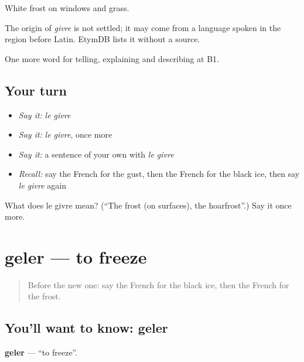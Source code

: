 White frost on windows and grass.

\begin{cousinweb}
The origin of \emph{givre} is not settled; it may come from a language spoken in the region before Latin. EtymDB lists it without a source.
\end{cousinweb}

\begin{grammarlens}[title={What you've built}]
One more word for telling, explaining and describing at B1.
\end{grammarlens}

\subsection*{Your turn}
\begin{itemize}
\raggedright
  \item \emph{Say it:} \emph{le givre}
  \item \emph{Say it:} \emph{le givre}, once more
  \item \emph{Say it:} a sentence of your own with \emph{le givre}
  \item \emph{Recall:} say the French for the gust, then the French for the black ice, then say \emph{le givre} again
\end{itemize}

\begin{tcolorbox}[breakable,colback=teal!4,colframe=teal!35!black,title={Before you move on}]
What does le givre mean? (\textquotedblleft{}The frost (on surfaces), the hoarfrost\textquotedblright{}.) Say it once more.
\end{tcolorbox}
\section[geler]{geler — to freeze}

\label{lesson:FR-C463-geler}



\begin{quote}
Before the new one: say the French for the black ice, then the French for the frost.
\end{quote}

\subsection*{You'll want to know: geler}
\textbf{geler} — \textquotedblleft{}to freeze\textquotedblright{}.

